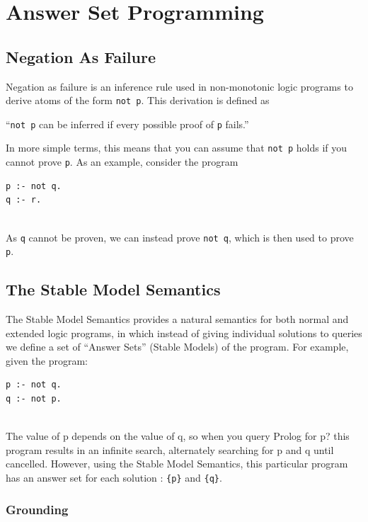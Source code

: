 \section{Answer Set Programming}

\subsection{Negation As Failure}
Negation as failure is an inference rule used in non-monotonic logic programs to derive atoms of the form \lstinline!not p!. This derivation is defined as 
\begin{displayquote}
``\lstinline!not p! can be inferred if every possible proof of \lstinline!p! fails.'' \cite{negAsFailure}
\end{displayquote}
In more simple terms, this means that you can assume that \lstinline!not p! holds if you cannot prove \lstinline!p!. 
As an example, consider the program \\

\begin{lstlisting}
p :- not q.
q :- r.
\end{lstlisting}
\mbox{}\\
As \lstinline!q! cannot be proven, we can instead prove \lstinline!not q!, which is then used to prove \lstinline!p!.

\subsection{The Stable Model Semantics}

The Stable Model Semantics \cite{KRnotes} provides a natural semantics for both normal and extended logic programs, in which instead of giving individual solutions to queries we define a set of ``Answer Sets'' (Stable Models) of the program. For example, given the program: \\

\begin{lstlisting}
p :- not q.
q :- not p.
\end{lstlisting}
\mbox{}\\
The value of p depends on the value of q, so when you query Prolog for p? this program results in an infinite search, alternately searching for p and q until cancelled. However, using the Stable Model Semantics, this particular program has an answer set for each solution : \lstinline!{p}! and \lstinline!{q}!.

\pagebreak
\subsubsection{Grounding}

